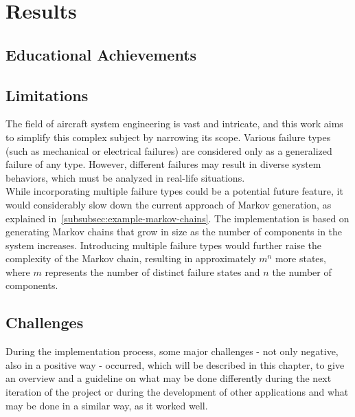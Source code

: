 \chapter{Results}\label{ch:results}
\section{Educational Achievements}\label{sec:educational-achievements}
\section{Limitations}\label{sec:limitations}
The field of aircraft system engineering is vast and intricate, and this work aims to simplify this complex subject by narrowing its scope.
Various failure types (such as mechanical or electrical failures) are considered only as a generalized failure of any type.
However, different failures may result in diverse system behaviors, which must be analyzed in real-life situations.
\\
While incorporating multiple failure types could be a potential future feature, it would considerably slow down the current
approach of Markov generation, as explained in~\ref{subsubsec:example-markov-chains}.
The implementation is based on generating Markov chains that grow in size as the number of components in the system increases.
Introducing multiple failure types would further raise the complexity of the Markov chain, resulting in approximately $m^n$ more states,
where $m$ represents the number of distinct failure states and $n$ the number of components.

\section{Challenges}\label{sec:challenges}
During the implementation process, some major challenges - not only negative, also in a positive way - occurred, which will be described in this chapter, to give an
overview and a guideline on what may be done differently during the next iteration of the project or during the development of other
applications and what may be done in a similar way, as it worked well.
